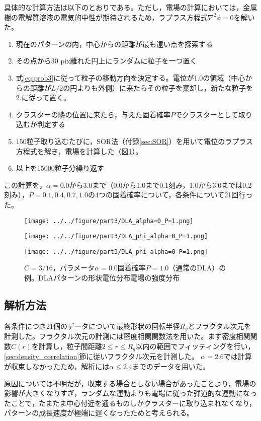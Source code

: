 \documentclass[autodetect-engine,dvi=dvipdfmx,a4paper,ja=standard,oneside,openany,11pt,draft]{bxjsbook}
\begin{document}
具体的な計算方法は以下のとおりである。ただし，電場の計算においては，金属樹の電解質溶液の電気的中性が期待されるため，ラプラス方程式$\nabla^2\phi=0$を解いた。
\begin{samepage}
  \begin{enumerate}
    \item 現在のパターンの内，中心からの距離が最も遠い点を探索する
    \item その点から30 pix離れた円上にランダムに粒子を一つ置く
    \item 式\ref{eq:prob3}に従って粒子の移動方向を決定する。電位が1.0の領域（中心からの距離が$L/2$の円よりも外側）に来たらその粒子を棄却し，新たな粒子を2.に従って置く。
    \item クラスターの隣の位置に来たら，与えた固着確率$P$でクラスターとして取り込むか判定する
    \item $150$粒子取り込むたびに，SOR法（付録\ref{sec:SOR}）を用いて電位のラプラス方程式を解き，電場を計算した（図\ref{fig:DLA_ex}）。
    \item 以上を15000粒子分繰り返す
  \end{enumerate}
\end{samepage}


この計算を，$\alpha=0.0$から$3.0$まで（0.0から1.0まで0.1刻み，1.0から3.0までは0.2刻み），$P=0.1,0.4,0.7,1.0$の4つの固着確率について，各条件について21回行った。
\begin{figure}[htbp]
  \begin{minipage}{0.32\hsize}
    \subcaption{}
    \centering
    \texttt{[image: ../../figure/part3/DLA\_alpha=0\_P=1.png]}
    \label{fig:DLA_alpha_0_P_1}
  \end{minipage}
  \begin{minipage}{0.32\hsize}
    \subcaption{}
    \centering
    \texttt{[image: ../../figure/part3/DLA\_phi\_alpha=0\_P=1.png]}
    \label{fig:DLA_phi_alpha_0_P_1}
  \end{minipage}
  \begin{minipage}{0.32\hsize}
    \subcaption{}
    \centering
    \texttt{[image: ../../figure/part3/DLA\_phi\_alpha=0\_P=1.png]}
    \label{fig:DLA_E_alpha_0_P_1}
  \end{minipage}
  \caption{$C=3/16$，パラメータ$\alpha=0.0$固着確率$P=1.0$（通常のDLA）の例。DLAパターンの形状電位分布電場の強度分布}
  \label{fig:DLA_ex}
\end{figure}
\subsection{解析方法}
各条件につき21個のデータについて最終形状の回転半径$R_g$とフラクタル次元を計測した。フラクタル次元の計測には密度相関関数法を用いた。まず密度相関関数$C(r)$を計算し，粒子間距離$2\leq r\leq R_g$以内の範囲でフィッティングを行い，\ref{sec:density_correlation}節に従いフラクタル次元を計測した。
$\alpha=2.6$では計算が収束しなかったため，解析には$\alpha\leq2.4$までのデータを用いた。

原因については不明だが，収束する場合としない場合があったことより，電場の影響が大きくなりすぎ，ランダムな運動よりも電場に従った弾道的な運動になったことで，たまたま中心付近を通るものしかクラスターに取り込まれなくなり，パターンの成長速度が極端に遅くなったためと考えられる。

\ifdraft{
  
  
}{}
\end{document}
